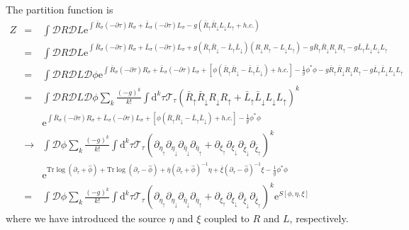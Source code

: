 \documentclass[12pt]{article}
\newcommand{\bea}{\begin{eqnarray}}
\newcommand{\eea}{\end{eqnarray}}
\newcommand{\md}{\mathrm{d}}
\newcommand{\me}{\mathrm{e}}
\begin{document}
The partition function is
\bea Z&=&\int{ \mathcal{D}R\mathcal{D}L \me^{\int{ \bar{R}_\sigma (-\partial\tau)R_\sigma + \bar{L}_\sigma (-\partial\tau)L_\sigma -g(\bar{R}_\uparrow \bar{R}_\downarrow L_\downarrow L_\uparrow + h.c.)} }} \\
&=&\int{ \mathcal{D}R\mathcal{D}L \me^{\int {\bar{R}_\sigma (-\partial\tau)R_\sigma + \bar{L}_\sigma (-\partial\tau)L_\sigma +g(\bar{R}_\uparrow \bar{R}_\downarrow-\bar{L}_\uparrow \bar{L}_\downarrow)(R_\downarrow R_\uparrow-L_\downarrow L_\uparrow) - g\bar{R}_\uparrow \bar{R}_\downarrow R_\downarrow R_\uparrow -g \bar{L}_\uparrow \bar{L}_\downarrow L_\downarrow L_\uparrow}}}  \\
&=&\int{ \mathcal{D}R\mathcal{D}L\mathcal{D}\phi \me^{ \int{  \bar{R}_\sigma (-\partial\tau)R_\sigma + \bar{L}_\sigma (-\partial\tau)L_\sigma +[\phi (\bar{R}_\uparrow \bar{R}_\downarrow-\bar{L}_\uparrow \bar{L}_\downarrow) + h.c.]-\frac1g\phi^*\phi  - g\bar{R}_\uparrow \bar{R}_\downarrow R_\downarrow R_\uparrow -g \bar{L}_\uparrow \bar{L}_\downarrow L_\downarrow L_\uparrow }}} \\
&=&\int \mathcal{D}R\mathcal{D}L\mathcal{D}\phi \sum_k \frac{(-g)^k}{k!} \int \md^k\tau \mathcal{T}_\tau (\bar{R}_\uparrow \bar{R}_\downarrow R_\downarrow R_\uparrow +\bar{L}_\uparrow \bar{L}_\downarrow L_\downarrow L_\uparrow)^k \nonumber\\ 
&&  \me^{ \int{  \bar{R}_\sigma (-\partial\tau)R_\sigma + \bar{L}_\sigma (-\partial\tau)L_\sigma +[\phi (\bar{R}_\uparrow \bar{R}_\downarrow-\bar{L}_\uparrow \bar{L}_\downarrow) + h.c.]-\frac1g\phi^*\phi  }} \\
&\rightarrow&\int \mathcal{D}\phi\sum_k\frac{(-g)^k}{k!}\int \md^k\tau\mathcal{T}_\tau(\partial_{\eta_\uparrow}\partial_{\eta_\downarrow}\partial_{\bar{\eta}_\downarrow}\partial_{\bar{\eta}_\uparrow}+\partial_{\xi_\uparrow}\partial_{\xi_\downarrow}\partial_{\bar{\xi}_\downarrow}\partial_{\bar{\xi}_\uparrow})^k \nonumber\\&& \me^{\mathrm{Tr}\log(\partial_\tau+\hat{\phi})+\mathrm{Tr}\log(\partial_\tau-\hat{\phi})+\bar{\eta}(\partial_\tau+\hat{\phi})^{-1}\eta+\bar{\xi}(\partial_\tau-\hat{\phi})^{-1}\xi-\frac1g\phi^*\phi} \\
&=& \int \mathcal{D}\phi \sum_k \frac{(-g)^k}{k!}\int \md^k\tau \mathcal{T}_\tau (\partial_{\eta_\uparrow}\partial_{\eta_\downarrow}\partial_{\bar{\eta}_\downarrow}\partial_{\bar{\eta}_\uparrow}+\partial_{\xi_\uparrow}\partial_{\xi_\downarrow}\partial_{\bar{\xi}_\downarrow}\partial_{\bar{\xi}_\uparrow})^k \me^{S[\phi,\eta,\xi]} \eea
where we have introduced the source $\eta$ and $\xi$ coupled to $R$ and $L$, respectively.
\end{document}
